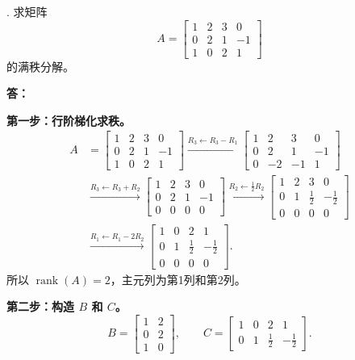 \documentclass{article}
\begin{document}
. 求矩阵
\[
A=\begin{bmatrix}
1 & 2 & 3 & 0 \\
0 & 2 & 1 & -1 \\
1 & 0 & 2 & 1
\end{bmatrix}
\]
的满秩分解。

\noindent \textbf{答：}

\textbf{第一步：行阶梯化求秩。}
\begin{align*}
A &= \begin{bmatrix}
1 & 2 & 3 & 0\\
0 & 2 & 1 & -1\\
1 & 0 & 2 & 1
\end{bmatrix}
\xrightarrow{R_3\leftarrow R_3-R_1}
\begin{bmatrix}
1 & 2 & 3 & 0\\
0 & 2 & 1 & -1\\
0 & -2 & -1 & 1
\end{bmatrix}\\
&\xrightarrow{R_3\leftarrow R_3+R_2}
\begin{bmatrix}
1 & 2 & 3 & 0\\
0 & 2 & 1 & -1\\
0 & 0 & 0 & 0
\end{bmatrix}
\xrightarrow{R_2\leftarrow \frac12 R_2}
\begin{bmatrix}
1 & 2 & 3 & 0\\
0 & 1 & \frac12 & -\frac12\\
0 & 0 & 0 & 0
\end{bmatrix}\\
&\xrightarrow{R_1\leftarrow R_1-2R_2}
\begin{bmatrix}
1 & 0 & 2 & 1\\
0 & 1 & \frac12 & -\frac12\\
0 & 0 & 0 & 0
\end{bmatrix}.
\end{align*}
所以 $\operatorname{rank}(A)=2$，主元列为第1列和第2列。

\textbf{第二步：构造 $B$ 和 $C$。}
\[
B = \begin{bmatrix}
1 & 2\\
0 & 2\\
1 & 0
\end{bmatrix},\qquad
C = \begin{bmatrix}
1 & 0 & 2 & 1\\
0 & 1 & \frac12 & -\frac12
\end{bmatrix}.
\]
\end{document}
